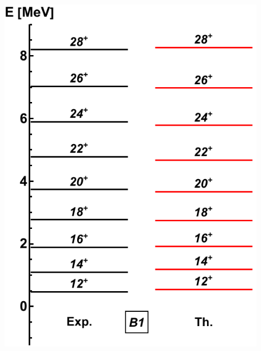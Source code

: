 \documentclass{beamer}
\begin{document}
\begin{frame}
\begin{columns}
\begin{column}{0.25\textwidth}
\begin{figure}
      \includegraphics[scale=0.3]{Figs/ba130-band1.pdf}

\end{figure}
\end{column}
\end{columns}
\end{frame}
\end{document}
